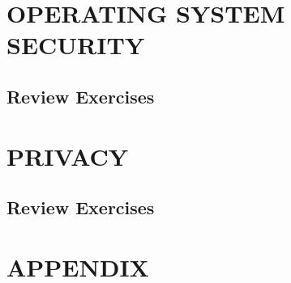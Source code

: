 \documentclass[a4paper, 10 pt, conference]{ieeeconf}
\begin{document}
\section{\textbf{OPERATING SYSTEM SECURITY}}
\subsection{\textbf{Review Exercises}}






\section{\textbf{PRIVACY}}
\subsection{\textbf{Review Exercises}}

\section*{APPENDIX}



\end{document}
